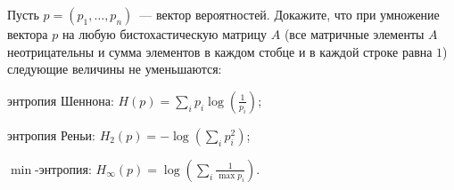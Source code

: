Пусть $p = (p_1, \dots, p_n)$~--- вектор вероятностей. Докажите, что при умножение вектора $p$ на любую бистохастическую
матрицу $A$ (все матричные элементы $A$ неотрицательны и сумма элементов в каждом стобце и в каждой строке равна $1$)
следующие величины не уменьшаются:
\begin{enumcyr}
    \item энтропия Шеннона: $H(p) = \sum\limits_{i} p_i \log(\frac{1}{p_i})$;
	\item энтропия Реньи: $H_2(p) = - \log(\sum\limits_{i} p_i^2)$;
    \item $\min$-энтропия: $H_{\infty}(p) = \log(\sum\limits_{i} \frac{1}{\max p_i})$.
\end{enumcyr}
